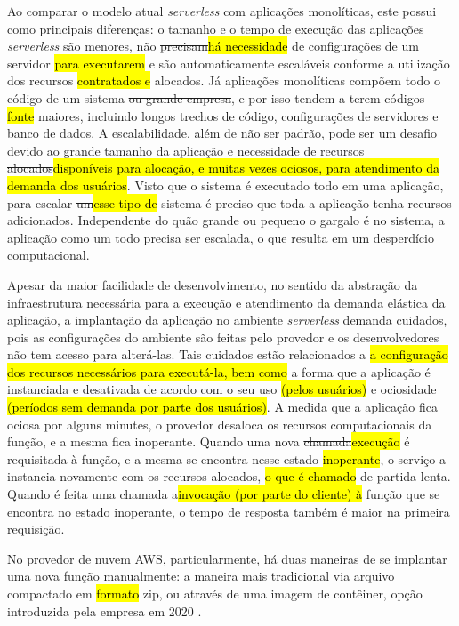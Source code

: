\documentclass[10pt,conference]{IEEEtran}
\begin{document}
Ao comparar o modelo atual \textit{serverless} com aplicações monolíticas, este possui como principais diferenças: o tamanho e o tempo de execução das aplicações \textit{serverless} são menores, não \st{precisam}\hl{há necessidade} de configurações de um servidor \hl{para executarem} e são automaticamente escaláveis conforme a utilização dos recursos \hl{contratados e} alocados. Já aplicações monolíticas compõem todo o código de um sistema \st{ou grande empresa}, e por isso tendem a terem códigos \hl{fonte} maiores, incluindo longos trechos de código, configurações de servidores e banco de dados. A escalabilidade, além de não ser padrão, pode ser um desafio devido ao grande tamanho da aplicação e necessidade de recursos \st{alocados}\hl{disponíveis para alocação, e muitas vezes ociosos, para atendimento da demanda dos usuários}. Visto que o sistema é executado todo em uma aplicação, para escalar \st{um}\hl{esse tipo de} sistema é preciso que toda a aplicação tenha recursos adicionados. Independente do quão grande ou pequeno o gargalo é no sistema, a aplicação como um todo precisa ser escalada, o que resulta em um desperdício computacional.

Apesar da maior facilidade de desenvolvimento, no sentido da abstração da infraestrutura necessária para a execução e atendimento da demanda elástica da aplicação, a implantação da aplicação no ambiente \textit{serverless} demanda cuidados, pois as configurações do ambiente são feitas pelo provedor e os desenvolvedores não tem acesso para alterá-las. Tais cuidados estão relacionados a \hl{a configuração dos recursos necessários para executá-la, bem como} a forma que a aplicação é instanciada e desativada de acordo com o seu uso \hl{(pelos usuários)} e ociosidade \hl{(períodos sem demanda por parte dos usuários)}. A medida que a aplicação fica ociosa por alguns minutes, o provedor desaloca os recursos computacionais da função, e a mesma fica inoperante. Quando uma nova \st{chamada}\hl{execução} é requisitada à função, e a mesma se encontra nesse estado \hl{inoperante}, o serviço a instancia novamente com os recursos alocados, \hl{o que é chamado} de partida lenta. Quando é feita uma c\st{hamada a}\hl{invocação (por parte do cliente) à} função que se encontra no estado inoperante, o tempo de resposta também é maior na primeira requisição.   

No provedor de nuvem AWS, particularmente, há duas maneiras de se implantar uma nova função manualmente: a maneira mais tradicional via arquivo compactado em \hl{formato} zip, ou através de uma imagem de contêiner, opção introduzida pela empresa em 2020 \cite{aws_2020_supports_container_image}.
\end{document}
